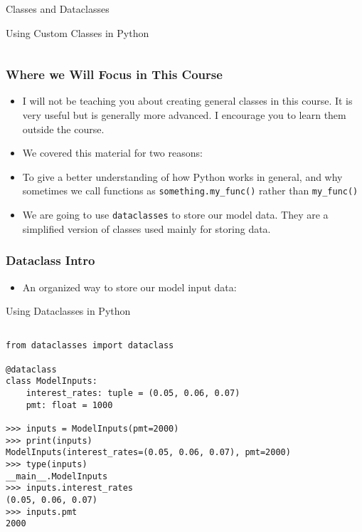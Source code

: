 \documentclass[handout, 11pt]{beamer}
\begin{document}
\begin{section}[Classes]{Classes and Dataclasses}
\begin{frame}[fragile]
\begin{block}{Using Custom Classes in Python}
\begin{verbatim}
\end{verbatim}
\end{block}
\end{frame}
\begin{frame}
\frametitle{Where we Will Focus in This Course}
\begin{itemize}
\item I will not be teaching you about creating general classes in this course. It is very useful but is generally more advanced. I encourage you to learn them outside the course.
\vfill
\item We covered this material for two reasons:
\vfill
\item To give a better understanding of how Python works in general, and why sometimes we call functions as
\texttt{something.my\_func()}
rather than
\texttt{my\_func()}
\vfill
\item We are going to use
\texttt{dataclasses}
to store our model data. They are
a simplified version of classes used mainly for storing data.
\end{itemize}
\end{frame}
\begin{frame}[fragile]
\frametitle{Dataclass Intro}
\begin{itemize}
\item An organized way to store our model input data:
\end{itemize}
\begin{block}{Using Dataclasses in Python}
\scriptsize
\begin{verbatim}

from dataclasses import dataclass

@dataclass
class ModelInputs:
    interest_rates: tuple = (0.05, 0.06, 0.07)
    pmt: float = 1000

>>> inputs = ModelInputs(pmt=2000)
>>> print(inputs)
ModelInputs(interest_rates=(0.05, 0.06, 0.07), pmt=2000)
>>> type(inputs)
__main__.ModelInputs
>>> inputs.interest_rates
(0.05, 0.06, 0.07)
>>> inputs.pmt
2000


\end{verbatim}
\end{block}
\end{frame}
\end{section}
\end{document}

